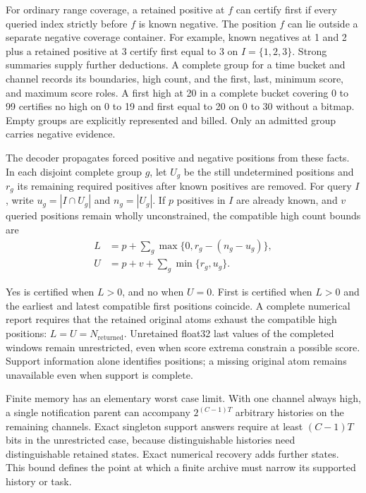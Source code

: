 \documentclass[a4paper,fleqn]{cas-dc}
\begin{document}
For ordinary range coverage, a retained positive at $f$ can certify first if every queried index strictly before $f$ is known negative. The position $f$ can lie outside a separate negative coverage container. For example, known negatives at 1 and 2 plus a retained positive at 3 certify first equal to 3 on $I=\{1,2,3\}$. Strong summaries supply further deductions. A complete group for a time bucket and channel records its boundaries, high count, and the first, last, minimum score, and maximum score roles. A first high at 20 in a complete bucket covering 0 to 99 certifies no high on 0 to 19 and first equal to 20 on 0 to 30 without a bitmap. Empty groups are explicitly represented and billed. Only an admitted group carries negative evidence.

The decoder propagates forced positive and negative positions from these facts. In each disjoint complete group $g$, let $U_g$ be the still undetermined positions and $r_g$ its remaining required positives after known positives are removed. For query $I$, write $u_g=|I\cap U_g|$ and $n_g=|U_g|$. If $p$ positives in $I$ are already known, and $v$ queried positions remain wholly unconstrained, the compatible high count bounds are
\begin{equation}\label{eq:bounds}
\begin{aligned}
L&=p+\sum_g\max\{0,r_g-(n_g-u_g)\},\\
U&=p+v+\sum_g\min\{r_g,u_g\}.
\end{aligned}
\end{equation}

Yes is certified when $L>0$, and no when $U=0$. First is certified when $L>0$ and the earliest and latest compatible first positions coincide. A complete numerical report requires that the retained original atoms exhaust the compatible high positions: $L=U=N_{\mathrm{returned}}$. Unretained float32 last values of the completed windows remain unrestricted, even when score extrema constrain a possible score. Support information alone identifies positions; a missing original atom remains unavailable even when support is complete.

Finite memory has an elementary worst case limit. With one channel always high, a single notification parent can accompany $2^{(C-1)T}$ arbitrary histories on the remaining channels. Exact singleton support answers require at least $(C-1)T$ bits in the unrestricted case, because distinguishable histories need distinguishable retained states. Exact numerical recovery adds further states. This bound defines the point at which a finite archive must narrow its supported history or task.
\end{document}
